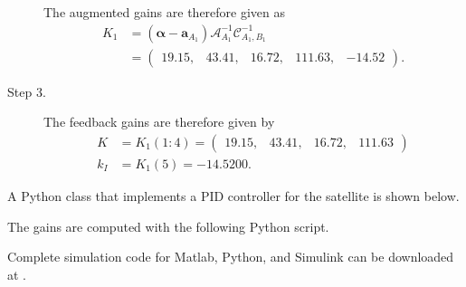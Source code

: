 \begin{description}
The augmented gains are therefore given as
\begin{align*}
K_1 &= (\boldsymbol{\alpha}-\mathbf{a}_{A_1})\mathcal{A}_{A_1}^{-1}\mathcal{C}_{A_1,B_1}^{-1} \\
  &= \begin{pmatrix} 19.15, &   43.41, &   16.72, &  111.63, &  -14.52 \end{pmatrix}.
\end{align*}

\item[Step 3.]
The feedback gains are therefore given by
\begin{align*}
K &= K_1(1:4) = \begin{pmatrix} 19.15, &   43.41, &   16.72, &  111.63 \end{pmatrix} \\
k_I &= K_1(5) = -14.5200.
\end{align*}
\end{description}

A Python class that implements a PID controller for the satellite is shown below.


The gains are computed with the following Python script. 


Complete simulation code for Matlab, Python, and Simulink can be downloaded at .

%
%
